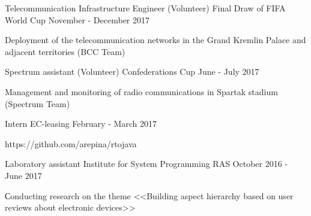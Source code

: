 \begin{cventries}
\cventry
{Telecommunication Infrastructure Engineer (Volunteer)} %
{Final Draw of FIFA World Cup} %
{} %
{November - December 2017} %
{ 
	\begin{cvitems}
		\item {Deployment of the telecommunication networks in the Grand Kremlin Palace and adjacent territories (BCC Team)}
	\end{cvitems}
}
	
\cventry
{Spectrum assistant (Volunteer)} %
{Confederations Cup} %
{} %
{June - July 2017} %
{ 
	\begin{cvitems}
		\item {Management and monitoring of radio communications in Spartak stadium (Spectrum Team)}
	\end{cvitems}
}

\cventry
{Intern} %
{EC-leasing} %
{} %
{February - March 2017} %
{ 
	\begin{cvitems}
		\item {https://github.com/arepina/rtojava}
	\end{cvitems}
}



\cventry
{Laboratory assistant} %
{Institute for System Programming RAS} %
{} %
{October 2016 - June 2017} %
{ 
	\begin{cvitems}
		\item {Сonducting research on the theme <<Building aspect hierarchy based on user reviews about electronic devices>>}
	\end{cvitems}
}




\end{cventries}